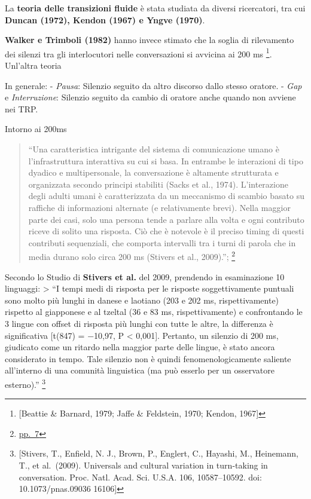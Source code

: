 \documentclass[
]{article}
\begin{document}
La \textbf{teoria delle transizioni fluide} è stata studiata da diversi ricercatori, tra cui \textbf{Duncan (1972), Kendon (1967) e Yngve (1970)}.

\textbf{Walker e Trimboli (1982)} hanno invece stimato che la soglia di rilevamento dei silenzi tra gli interlocutori nelle conversazioni si avvicina ai 200 ms \footnote{{[}Beattie \& Barnard, 1979; Jaffe \& Feldstein, 1970; Kendon, 1967{]}}. Unl'altra teoria

In generale: - \emph{Pausa}: Silenzio seguito da altro discorso dallo stesso oratore. - \emph{Gap} e \emph{Interruzione}: Silenzio seguito da cambio di oratore anche quando non avviene nei TRP.

Intorno ai 200ms

\begin{quote}
``Una caratteristica intrigante del sistema di comunicazione umano è l'infrastruttura interattiva su cui si basa. In entrambe le interazioni di tipo dyadico e multipersonale, la conversazione è altamente strutturata e organizzata secondo principi stabiliti (Sacks et al., 1974). L'interazione degli adulti umani è caratterizzata da un meccanismo di scambio basato su raffiche di informazioni alternate (e relativamente brevi). Nella maggior parte dei casi, solo una persona tende a parlare alla volta e ogni contributo riceve di solito una risposta. Ciò che è notevole è il preciso timing di questi contributi sequenziali, che comporta intervalli tra i turni di parola che in media durano solo circa 200 ms (Stivers et al., 2009).''; \footnote{\href{DOC/608110.pdf}{pp.~7}}
\end{quote}

Secondo lo Studio di \textbf{Stivers et al.} del 2009, prendendo in esaminazione 10 linguaggi: \textgreater{} ``I tempi medi di risposta per le risposte soggettivamente puntuali sono molto più lunghi in danese e laotiano (203 e 202 ms, rispettivamente) rispetto al giapponese e al tzeltal (36 e 83 ms, rispettivamente) e confrontando le 3 lingue con offset di risposta più lunghi con tutte le altre, la differenza è significativa {[}t(847) = −10,97, P \textless{} 0,001{]}. Pertanto, un silenzio di 200 ms, giudicato come un ritardo nella maggior parte delle lingue, è stato ancora considerato in tempo. Tale silenzio non è quindi fenomenologicamente saliente all'interno di una comunità linguistica (ma può esserlo per un osservatore esterno).'' \footnote{{[}Stivers, T., Enfield, N. J., Brown, P., Englert, C., Hayashi, M., Heinemann, T., et al.~(2009). Universals and cultural variation in turn-taking in conversation. Proc. Natl. Acad. Sci. U.S.A. 106, 10587--10592. doi: 10.1073/pnas.09036 16106{]}}
\end{document}
